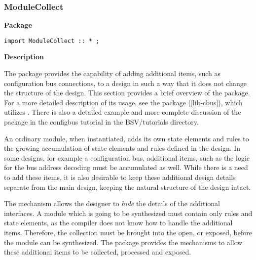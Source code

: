\subsubsection{ModuleCollect}

{\bf Package}
\label{package-modulecollect}

\begin{verbatim}
import ModuleCollect :: * ;
\end{verbatim}


{\bf Description}

The  package provides the capability of adding
additional items, such as configuration bus connections, 
to a design in such a way that it does not change the 
structure of the design.  This section provides a brief overview of
the package.  
For a more detailed description of its usage, see the 
package (\ref{lib-cbus}), which utilizes  .
There is also  a detailed  example and  more complete discussion of the 
package in the configbus tutorial in the BSV/tutorials directory.


An ordinary {\BS} module, when instantiated, adds its own state
elements and rules to
the growing accumulation of state elements and rules defined in the
design.  In some designs, for example a configuration bus, additional
items, such as the logic for the
 bus address decoding  must be accumulated as well. While there is a
need to add these items, it is also desirable to keep these
additional design details separate from the main design, keeping the
natural structure of the design intact.  

The  mechanism allows the designer to \emph{hide} the details of the
additional interfaces.    A module which is going to be synthesized must contain
only rules and state elements, as the compiler does not know how to
handle the additional items.  Therefore, the collection must be
brought into the open, or exposed, before the module can be
synthesized.  The  package 
provides the mechanisms to allow these additional
items to be collected, processed and exposed.


